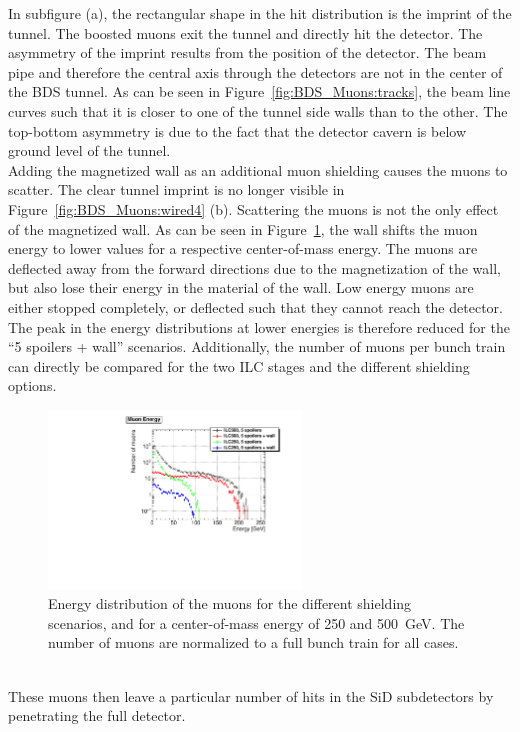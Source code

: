 In subfigure (a), the rectangular shape in the hit distribution is the imprint of the tunnel.
The boosted muons exit the tunnel and directly hit the detector.
The asymmetry of the imprint results from the position of the detector.
The beam pipe and therefore the central axis through the detectors are not in the center of the BDS tunnel.
As can be seen in Figure~\ref{fig:BDS_Muons:tracks}, the beam line curves such that it is closer to one of the tunnel side walls than to the other.
The top-bottom asymmetry is due to the fact that the detector cavern is below ground level of the tunnel.
\\Adding the magnetized wall as an additional muon shielding causes the muons to scatter.
The clear tunnel imprint is no longer visible in Figure~\ref{fig:BDS_Muons:wired4} (b).
Scattering the muons is not the only effect of the magnetized wall.
As can be seen in Figure~\ref{fig:BDS_Muons:energy}, the wall shifts the muon energy to lower values for a respective center-of-mass energy.
The muons are deflected away from the forward directions due to the magnetization of the wall, but also lose their energy in the material of the wall.
Low energy muons are either stopped completely, or deflected such that they cannot reach the detector. %
The peak in the energy distributions at lower energies is therefore reduced for the ``5 spoilers + wall'' scenarios.
Additionally, the number of muons per bunch train can directly be compared for the two ILC stages and the different shielding options.
\begin{figure}[htbp]
\centering
\includegraphics[width=0.6\textwidth]{Figures/BDS_muons/Energy_Comparison_ILC500vsILC250.pdf}
\caption[Muon energy]{Energy distribution of the muons for the different shielding scenarios, and for a center-of-mass energy of 250 and \SI{500}{\GeV}.
The number of muons are normalized to a full bunch train for all cases.}
\label{fig:BDS_Muons:energy}
\end{figure}
\\These muons then leave a particular number of hits in the SiD subdetectors by penetrating the full detector.
